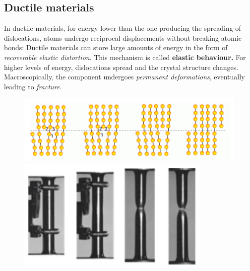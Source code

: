 \documentclass[class=report, crop=false, 12pt,a4paper]{standalone}
\begin{document}
\subsection{Ductile materials}
In ductile materials, for energy lower than the one producing the spreading of dislocations, atoms undergo reciprocal displacements without breaking atomic bonds: Ductile materials can store large amounts of energy in the form of \textit{recoverable elastic distortion}. This mechanism is called \textbf{elastic behaviour.} For higher levels of energy, dislocations spread and the crystal structure changes. Macroscopically, the component undergoes \textit{permanent deformations}, eventually leading to \textit{fracture.}
\begin{figure}
  \begin{center}
    \begin{minipage}[b]{0.46\textwidth}
      \centering
      \includegraphics[width = \textwidth]{../img/diagram73.png}
      \caption{}
    \end{minipage}
    \begin{minipage}[b]{0.46\textwidth}
      \centering
      \includegraphics[width = \textwidth]{../img/diagram74.png}
      \caption{}
    \end{minipage}
  \end{center}
\end{figure}
\end{document}
